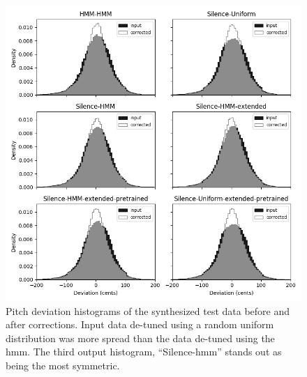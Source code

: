 \begin{figure}[h!]
    \centering
    \includegraphics[width=\columnwidth]{figures/test-comparison.png}
    \caption{Pitch deviation histograms of the synthesized test data before and after corrections. Input data de-tuned using a random uniform distribution was more spread than the data de-tuned using the \gls{hmm}. The third output histogram, ``Silence-\gls{hmm}'' stands out as being the most symmetric.}
    \label{fig:test-comparison}
\end{figure}

